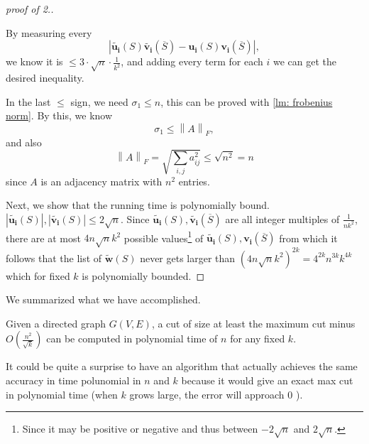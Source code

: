 \begin{proof}[proof of 2.]
  \begin{note}
    By measuring every
   \[
    \left\vert \widetilde{\mathbf{u_i} }(S) \widetilde{\mathbf{v_i} }  (\overline{S} ) - \mathbf{u_i}(S) \mathbf{v_i}(\overline{S} ) \right\vert,
   \] we know it is \(\le 3 \cdot \sqrt{n} \cdot \frac{1}{k^2} \), and adding every term for each \(i\) we can get the desired inequality.  

   In the last \(\le\) sign, we need \(\sigma _1 \le n\), this can be proved with \autoref{lm: frobenius norm}. By this, we know 
   \[
    \sigma _1 \le \left\lVert A \right\rVert _F, 
   \] and also 
   \[
    \left\lVert A \right\rVert _F = \sqrt{\sum_{i, j} a_{ij}^2 } \le \sqrt{n^2} = n  
   \] since \(A\) is an adjacency matrix with \(n^2\) entries.  
  \end{note}

  Next, we show that the running time is polynomially bound. \(\left\vert \widetilde{\mathbf{u_i} }(S)   \right\vert , \left\vert \widetilde{\mathbf{v_i} }(S)  \right\vert \le 2\sqrt{n}  \). Since \(\widetilde{\mathbf{u_i} }(S), \widetilde{\mathbf{v_i} }(\overline{S} )  \) are all integer multiples of \(\frac{1}{nk^2}\), there are at most \(4n\sqrt{n}k^2 \) possible values\footnote{Since it may be positive or negative and thus between \(-2\sqrt{n} \) and \(2\sqrt{n} \).  } of \(\widetilde{\mathbf{u_i} }(S),  \mathbf{v_i}(\overline{S} ) \) from which it follows that the list of \(\widetilde{\mathbf{w} } (S)\) never gets larger than \(\left( 4n\sqrt{n}k^2  \right)^{2k} = 4^{2k} n^{3k} k^{4k}  \) which for fixed \(k\) is polynomially bounded.        
\end{proof}

We summarized what we have accomplished. 
\begin{theorem}
  Given a directed graph \(G(V,E)\), a cut of size at least the maximum cut minus \(O\left( \frac{n^2}{\sqrt{k} } \right) \) can be computed in polynomial time of \(n\) for any fixed \(k\).   
\end{theorem}

It could be quite a surprise to have an algorithm that actually achieves the same accuracy in time polunomial in \(n\) and \(k\) because it would give an exact max cut in polynomial time (when \(k\) grows large, the error will approach \(0\)  ).  

